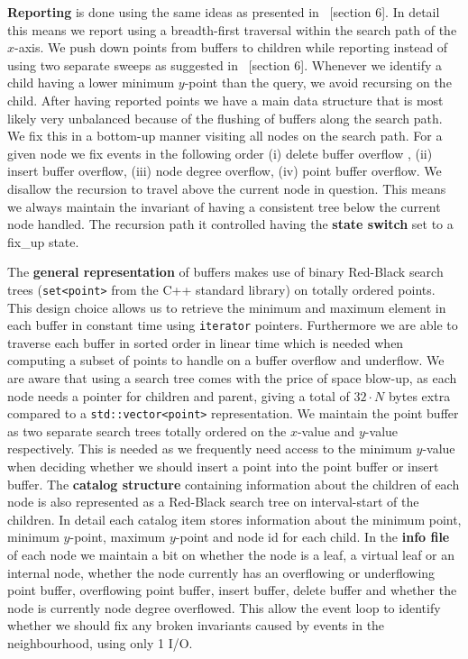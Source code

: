 \documentclass[twoside,11pt,openright]{report}
\begin{document}
\textbf{Reporting} is done using the same ideas as presented in ~\cite{DBLP:journals/corr/Brodal15}[section 6]. In detail this means we report using a breadth-first traversal within the search path of the $x$-axis. We push down points from buffers to children while reporting instead of using two separate sweeps as suggested in ~\cite{DBLP:journals/corr/Brodal15}[section 6]. Whenever we identify a child having a lower minimum $y$-point than the query, we avoid recursing on the child. After having reported points we have a main data structure that is most likely very unbalanced because of the flushing of buffers along the search path. We fix this in a bottom-up manner visiting all nodes on the search path. For a given node we fix events in the following order (i) delete buffer overflow , (ii) insert buffer overflow, (iii) node degree overflow, (iv) point buffer overflow. We disallow the recursion to travel above the current node in question. This means we always maintain the invariant of having a consistent tree below the current node handled. The recursion path it controlled having the \textbf{state switch} set to a fix\_up state.

The \textbf{general representation} of buffers makes use of binary Red-Black search trees (\texttt{set<point>} from the C++ standard library) on totally ordered points. This design choice allows us to retrieve the minimum and maximum element in each buffer in constant time using \texttt{iterator} pointers. Furthermore we are able to traverse each buffer in sorted order in linear time which is needed when computing a subset of points to handle on a buffer overflow and underflow. We are aware that using a search tree comes with the price of space blow-up, as each node needs a pointer for children and parent, giving a total of $32 \cdot N$ bytes extra compared to a \texttt{std::vector<point>} representation. We maintain the point buffer as two separate search trees totally ordered on the $x$-value and $y$-value respectively. This is needed as we frequently need access to the minimum $y$-value when deciding whether we should insert a point into the point buffer or insert buffer. The \textbf{catalog structure} containing information about the children of each node is also represented as a Red-Black search tree on interval-start of the children. In detail each catalog item stores information about the minimum point, minimum $y$-point, maximum $y$-point and node id for each child. In the \textbf{info file} of each node we maintain a bit on whether the node is a leaf, a virtual leaf or an internal node, whether the node currently has an overflowing or underflowing point buffer, overflowing point buffer, insert buffer, delete buffer and whether the node is currently node degree overflowed. This allow the event loop to identify whether we should fix any broken invariants caused by events in the neighbourhood, using only 1 I/O.
\end{document}

